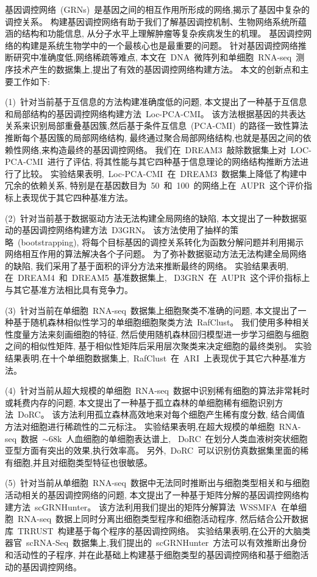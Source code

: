 \begin{abstractcn}
基因调控网络~(GRNs)~是基因之间的相互作用所形成的网络,揭示了基因中复杂的调控关系。
构建基因调控网络有助于我们了解基因调控机制、生物网络系统所蕴涵的结构和功能信息,
从分子水平上理解肿瘤等复杂疾病发生的机理。
基因调控网络的构建是系统生物学中的一个最核心也是最重要的问题。
针对基因调控网络推断研究中准确度低,网络稀疏等难点, 
本文在~DNA~微阵列和单细胞~RNA-seq~测序技术产生的数据集上,提出了有效的基因调控网络构建方法。
本文的创新点和主要工作如下:

(1)~针对当前基于互信息的方法构建准确度低的问题,
本文提出了一种基于互信息和局部结构的基因调控网络构建方法~Loc-PCA-CMI。
该方法根据基因的共表达关系来识别局部重叠基因簇,然后基于条件互信息~(PCA-CMI)~的路径一致性算法推断每个基因簇的局部网络结构,
最终通过聚合局部网络结构,也就是基因之间的依赖性网络,来构造最终的基因调控网络。
我们在~DREAM3~敲除数据集上对~LOC-PCA-CMI~进行了评估,
将其性能与其它四种基于信息理论的网络结构推断方法进行了比较。
实验结果表明,~Loc-PCA-CMI~在~DREAM3~数据集上降低了构建中冗余的依赖关系,
特别是在基因数目为~50~和~100~的网络上在~AUPR~这个评价指标上表现优于其它四种基准方法。

(2)~针对当前基于数据驱动方法无法构建全局网络的缺陷,
本文提出了一种数据驱动的基因调控网络构建方法~D3GRN。
该方法使用了抽样的策略~(bootstrapping),
将每个目标基因的调控关系转化为函数分解问题并利用揭示网络相互作用的算法解决各个子问题。
为了弥补数据驱动方法无法构建全局网络的缺陷,
我们采用了基于面积的评分方法来推断最终的网络。
实验结果表明,在~DREAM4~和~DREAM5~基准数据集上,
~D3GRN~在~AUPR~这个评价指标上与其它基准方法相比具有竞争力。

(3)~针对当前在单细胞~RNA-seq~数据集上细胞聚类不准确的问题,
本文提出了一种基于随机森林相似性学习的单细胞细胞聚类方法~RafClust。
我们使用多种相关性度量方法来刻画细胞的特征, 
然后使用随机森林回归模型进一步学习细胞与细胞之间的相似性矩阵,
基于相似性矩阵后采用层次聚类来决定细胞的最终类别。
实验结果表明,在十个单细胞数据集上,~RafClust~在~ARI~上表现优于其它六种基准方法。

(4)~针对当前从超大规模的单细胞~RNA-seq~数据中识别稀有细胞的算法非常耗时或耗费内存的问题,
本文提出了一种基于孤立森林的单细胞稀有细胞识别方法~DoRC。
该方法利用孤立森林高效地来对每个细胞产生稀有度分数,
结合阈值方法对细胞进行稀疏性的二元标注。
实验结果表明,在超大规模的单细胞~RNA-seq~数据~${\sim}68$k~人血细胞的单细胞表达谱上,
~DoRC~在划分人类血液树突状细胞亚型方面有突出的效果,执行效率高。
另外,~DoRC~可以识别仿真数据集里面的稀有细胞,并且对细胞类型特征也很敏感。

(5)~针对当前从单细胞~RNA-seq~数据中无法同时推断出与细胞类型相关和与细胞活动相关的基因调控网络的问题,
本文提出了一种基于矩阵分解的基因调控网络构建方法~scGRNHunter。
该方法利用我们提出的矩阵分解算法~WSSMFA~在单细胞~RNA-seq~数据上同时分离出细胞类型程序和细胞活动程序,
然后结合公开数据库~TRRUST~构建基于每个程序的基因调控网络。
实验结果表明,在公开的大脑类器官~scRNA-Seq~数据集上,我们提出的~scGRNHunter~方法可以有效推断出身份和活动性的子程序, 
并在此基础上构建基于细胞类型的基因调控网络和基于细胞活动的基因调控网络。


\end{abstractcn}